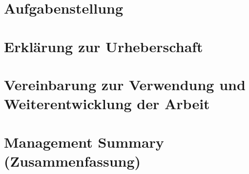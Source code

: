 \documentclass[12pt, a4paper]{report}
\begin{document}
	\listoftodos
	
	
	\tableofcontents
	
	
	\chapter{Aufgabenstellung}
	
	
	
	
	\chapter{Erklärung zur Urheberschaft}
	
	
	
	
	\chapter{Vereinbarung zur Verwendung und Weiterentwicklung der Arbeit}
	
	
	
	\chapter{Management Summary (Zusammenfassung)}
	
	
	
	
\end{document}

